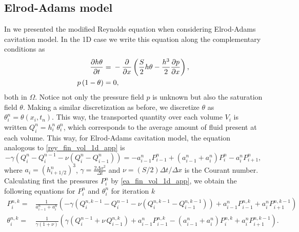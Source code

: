 \subsection{Elrod-Adams model}\label{sec:num_elrod-adams} In  we presented the modified Reynolds equation when considering Elrod-Adams cavitation model. In the 1D case we write this equation along the complementary conditions as
\begin{align}
\parder{h\theta}{t}={}&-\parder{}{x}\left(\frac{S}{2}h\theta-\frac{h^3}{2}\parder{p}{x}\right),\\
p\,(1-\theta)={}&0,\label{eq:chap5_comp_p_theta}
\end{align}
both in $\Omega$. Notice not only the pressure field $p$ is unknown but also the saturation field $\theta$. Making a similar discretization as before, we discretize $\theta$ as $\theta_i^n=\theta(x_i,t_n)$. This way, the transported quantity over each volume $V_i$ is written $Q^n_i=h_i^n\,\theta_i^n$, which corresponds to the average amount of fluid present at each volume. This way, for Elrod-Adams cavitation model, the equation analogous to \eqref{rey_fin_vol_1d_app} is
\begin{equation}
-\gamma\left(Q_i^n-Q_i^{n-1}-\nu\left(Q_i^n-Q_{i-1}^n\right)\right)=-a^n_{i-1} P_{i-1}^n+\left(a^n_{i-1}
+a^n_{i}\right)P_i^n - a^n_{i} P_{i+1}^n,\label{eq:ea_fin_vol_1d_app}
\end{equation}
where $a_i=\left(h_{i+1/2}^n\right)^3$, $\gamma =\frac{2\Delta x^2}{\Delta t}$ and $\nu=(S/2)\Delta t / \Delta x$ is the Courant number. Calculating first the pressures $P_i^n$ by \eqref{ea_fin_vol_1d_app}, we obtain the following equations for $P_i^{n}$ and $\theta_i^{n}$ for  iteration $k$
\begin{align}
P^{n,k}_i={}& \frac{1}{a^n_{i-1}
+a^n_{i}}\left(-\gamma\left(Q_i^{n,k-1}-Q_i^{n-1}-\nu\left(Q_i^{n,k-1}-Q_{i-1}^{n,k-1}\right)\right)+a^n_{i-1} P_{i-1}^{n,k}+a^n_{i} P_{i+1}^{n,k-1}\right)\label{eq:ea_gauss_pnk}\\ 
\theta^{n,k}_i ={}& \frac{1}{\gamma(1+\nu)}\left(
\gamma \left(Q_i^{n-1}+\nu\,Q_{i-1}^{n,k}\right)
+a^n_{i-1} P_{i-1}^{n,k}-\left(a^n_{i-1}
+a^n_{i}\right)P_i^{n,k} +a^n_{i} P_{i+1}^{n,k-1}\right).\label{eq:ea_gauss_thetank}
\end{align}
